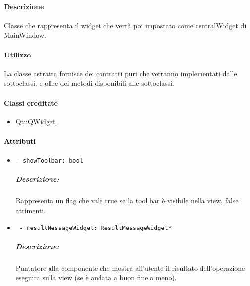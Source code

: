 \paragraph{Descrizione \\}
Classe che rappresenta il widget che verrà poi impostato come centralWidget di MainWindow.
\paragraph{Utilizzo\\}
La classe astratta fornisce dei contratti puri che verranno implementati dalle sottoclassi, e offre dei metodi disponibili alle sottoclassi.
\paragraph{Classi ereditate\\}
\begin{itemize}
\item Qt::QWidget.
\end{itemize}
\paragraph{\textcolor{black}{Attributi\\}}
\begin{itemize}
\item \color{teal}\verb!- showToolbar: bool!
\color{black}
\subparagraph{Descrizione: }Rappresenta un flag che vale true se la tool bar è visibile nella view, false atrimenti.
\item \color{teal} \verb! - resultMessageWidget: ResultMessageWidget*!
\subparagraph{Descrizione:} Puntatore alla componente che mostra all'utente il risultato dell'operazione eseguita sulla view (se è andata a buon fine o meno).
\end{itemize}

